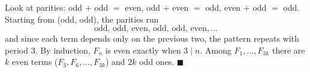 Look at parities: odd $+$ odd $=$ even, odd $+$ even $=$ odd, even $+$ odd $=$ odd. Starting from (odd, odd), the parities run
\[\text{odd, odd, even, odd, odd, even},\dots\]
and since each term depends only on the previous two, the pattern repeats with period $3$. By induction, $F_n$ is even exactly when $3\mid n$. Among $F_1,\dots,F_{3k}$ there are $k$ even terms ($F_3,F_6,\dots,F_{3k}$) and $2k$ odd ones. $\blacksquare$
